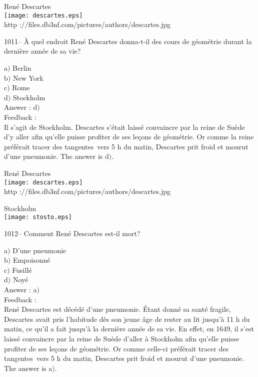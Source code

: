 \documentclass[letterpaper, 12pt]{article}
\begin{document}
        \begin{center}
        Ren\'e Descartes\\
    \texttt{[image: descartes.eps]}\\
        {\footnotesize http
://files.db3nf.com/pictures/authors/descartes.jpg}
    \end{center}

1011-- \`A quel endroit Ren\'e Descartes donna-t-il des cours de
g\'eom\'etrie durant la derni\`ere ann\'ee de sa vie?

a$)$ Berlin \\
b$)$ New York \\
c$)$ Rome \\
d$)$ Stockholm\\

Answer : d$)$\\

Feedback :\\
Il s'agit de Stockholm. Descartes s'\'etait laiss\'e convaincre par
la reine de Su\`ede d'y aller afin qu'elle puisse profiter de ses
le\c cons de g\'eom\'etrie.  Or comme la reine pr\'ef\'erait \og
tracer des tangentes\fg\ vers 5 h du matin, Descartes prit froid et
mourut d'une pneumonie.
The answer is d$)$.\\

        \begin{center}
        Ren\'e Descartes\\
    \texttt{[image: descartes.eps]}\\
        {\footnotesize http
://files.db3nf.com/pictures/authors/descartes.jpg}
    \end{center}

        \begin{center}
        Stockholm\\
    \texttt{[image: stosto.eps]}\\
    \end{center}

1012-- Comment Ren\'e Descartes est-il mort?

a$)$ D'une pneumonie \\
b$)$ Empoisonn\'e \\
c$)$ Fusill\'e \\
d$)$ Noy\'e\\

Answer : a$)$\\

Feedback :\\
Ren\'e Descartes est d\'ec\'ed\'e d'une pneumonie. \'Etant donn\'e
sa sant\'e fragile, Descartes avait pris l'habitude d\`es son jeune
\^age de rester au lit jusqu'\`a 11 h du matin, ce qu'il a fait
jusqu'\`a la derni\`ere ann\'ee de sa vie.  En effet, en 1649, il
s'est laiss\'e convaincre par la reine de Su\`ede d'aller \`a
Stockholm afin qu'elle puisse profiter de ses le\c cons de
g\'eom\'etrie.  Or comme celle-ci pr\'ef\'erait \og tracer des
tangentes\fg\ vers 5 h du matin, Descartes prit froid et mourut
d'une pneumonie.
The answer is a$)$.\\
\end{document}
